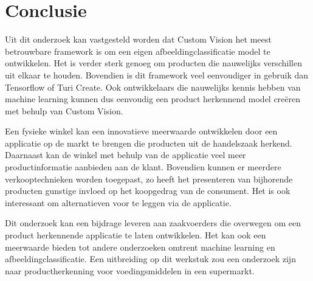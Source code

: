 
\chapter{Conclusie}
\label{ch:conclusie}



Uit dit onderzoek kan vastgesteld worden dat Custom Vision het meest betrouwbare framework is om een eigen afbeeldingclassificatie model te ontwikkelen. Het is verder sterk genoeg om producten die nauwelijks verschillen uit elkaar te houden. Bovendien is dit framework veel eenvoudiger in gebruik dan Tensorflow of Turi Create. Ook ontwikkelaars die nauwelijks kennis hebben van machine learning kunnen dus eenvoudig een product herkennend model creëren met behulp van Custom Vision. 

Een fysieke winkel kan een innovatieve meerwaarde ontwikkelen door een applicatie op de markt te brengen die producten uit de handelszaak herkend. Daarnaast kan de winkel met behulp van de applicatie veel meer productinformatie aanbieden aan de klant. Bovendien kunnen er meerdere verkooptechnieken worden toegepast, zo heeft het presenteren van bijhorende producten gunstige invloed op het koopgedrag van de consument.  Het is ook interessant om alternatieven voor te leggen via de applicatie. 

Dit onderzoek kan een bijdrage leveren aan zaakvoerders die overwegen om een product herkennende applicatie te laten ontwikkelen. Het kan ook een meerwaarde bieden tot andere onderzoeken omtrent machine learning en afbeeldingclassificatie. Een uitbreiding op dit werkstuk zou een onderzoek zijn naar productherkenning voor voedingsmiddelen in een supermarkt. 